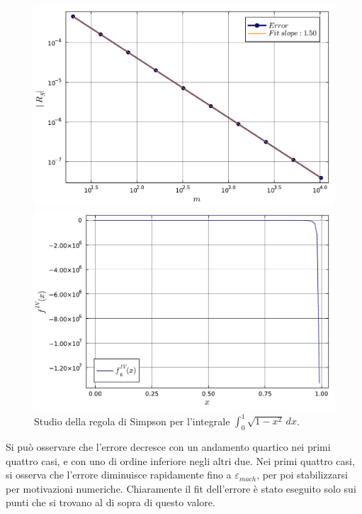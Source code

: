 \documentclass[letterpaper, 12pt]{article}
\numberwithin{equation}{section}    %
\begin{document}
\begin{figure}[!ht]
    \centering
    \begin{minipage}[b]{0.42\textwidth}
        \includegraphics[width=\textwidth]{5146.pdf}
    \end{minipage}
    \hspace{0.5cm}
    \begin{minipage}[b]{0.42\textwidth}
        \includegraphics[width=\textwidth]{5146_2.pdf}
    \end{minipage}
    \caption{Studio della regola di Simpson per l'integrale $\int_0^1 \sqrt{1-x^2}\, dx$.}
    \label{fig:es5_1_4_6}
\end{figure}

Si può osservare che l'errore decresce con un andamento quartico nei primi quattro casi, e con uno di ordine 
inferiore negli altri due. Nei primi quattro casi, si osserva che l'errore diminuisce rapidamente
fino a $\varepsilon_{mach}$, per poi stabilizzarsi per motivazioni numeriche. Chiaramente il fit
dell'errore è stato eseguito solo sui punti che si trovano al di sopra di questo valore.
\end{document}
